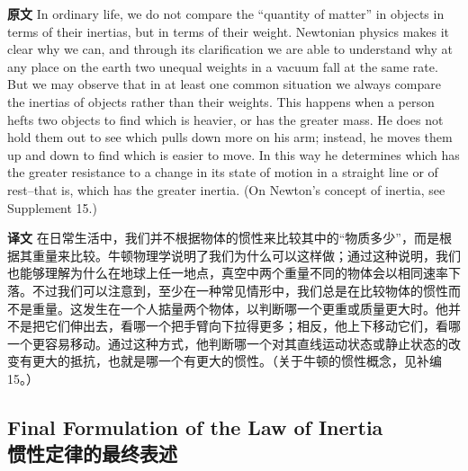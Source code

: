 \documentclass[UTF8,zihao=-4]{ctexart}
\begin{document}
\noindent\textbf{原文} In ordinary life, we do not compare the ``quantity of matter'' in objects in terms of their inertias, but in terms of their weight. Newtonian physics makes it clear why we can, and through its clarification we are able to understand why at any place on the earth two unequal weights in a vacuum fall at the same rate. But we may observe that in at least one common situation we always compare the inertias of objects rather than their weights. This happens when a person hefts two objects to find which is heavier, or has the greater mass. He does not hold them out to see which pulls down more on his arm; instead, he moves them up and down to find which is easier to move. In this way he determines which has the greater resistance to a change in its state of motion in a straight line or of rest--that is, which has the greater inertia. (On Newton's concept of inertia, see Supplement 15.)
\par\noindent\textbf{译文} 在日常生活中，我们并不根据物体的惯性来比较其中的“物质多少”，而是根据其重量来比较。牛顿物理学说明了我们为什么可以这样做；通过这种说明，我们也能够理解为什么在地球上任一地点，真空中两个重量不同的物体会以相同速率下落。不过我们可以注意到，至少在一种常见情形中，我们总是在比较物体的惯性而不是重量。这发生在一个人掂量两个物体，以判断哪一个更重或质量更大时。他并不是把它们伸出去，看哪一个把手臂向下拉得更多；相反，他上下移动它们，看哪一个更容易移动。通过这种方式，他判断哪一个对其直线运动状态或静止状态的改变有更大的抵抗，也就是哪一个有更大的惯性。（关于牛顿的惯性概念，见补编15。）
\medskip

\subsection*{Final Formulation of the Law of Inertia\\惯性定律的最终表述}
\end{document}
